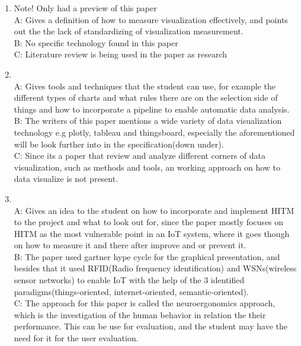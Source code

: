 \documentclass{article}
\begin{document}
\begin{enumerate}
	\item  \cite{zhu2007measuring} Note! Only had a preview of this paper
		\\A: Gives a definition of how to measure visualization effectively, and points out the the lack of standardizing of visualization measurement.
		\\B: No specific technology found in this paper
		\\C: Literature review is being used in the paper as research
	\item  \cite{protopsaltis2020data}
		\\A: Gives tools and techniques that the student can use, for example the different types of charts and what rules there are on the selection side of things and how to incorporate a pipeline to enable automatic data analysis.
		\\B: The writers of this paper mentions a wide variety of data visualization technology e.g plotly, tableau and thingsboard, especially the aforementioned will be look further into in the specification(down under).
		\\C: Since its a paper that review and analyze different corners of data visualization, such as methods and tools, an working approach on how to data visualize is not present.
	\item \cite{nuamah2017human}
		\\A: Gives an idea to the student on how to incorporate and implement HITM to the project and what to look out for, since the paper mostly focuses on HITM as the most vulnerable point in an IoT system, where it goes though on how to measure it and there after improve and or prevent it.
		\\B: The paper used gartner hype cycle for the graphical presentation, and besides that it used RFID(Radio frequency identification) and WSNs(wireless sensor networks) to enable IoT with the help of the 3 identified paradigms(things-oriented, internet-oriented, semantic-oriented).
		\\C: The approach for this paper is called the neuroergonomics approach, which is the investigation of the human behavior in relation the their performance. This can be use for evaluation, and the student may have the need for it for the user evaluation.

\end{enumerate}
\end{document}
